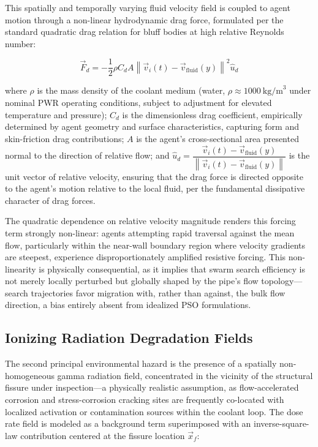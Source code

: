 \documentclass[journal]{IEEEtran}
\begin{document}
This spatially and temporally varying fluid velocity field is coupled to agent motion through a non-linear hydrodynamic drag force, formulated per the standard quadratic drag relation for bluff bodies at high relative Reynolds number:

\begin{equation}
\vec{F}_d = -\frac{1}{2}\rho C_d A \left\|\vec{v}_i(t) - \vec{v}_{\text{fluid}}(y)\right\|^2 \hat{u}_d
\end{equation}

where $\rho$ is the mass density of the coolant medium (water, $\rho \approx 1000\ \text{kg/m}^3$ under nominal PWR operating conditions, subject to adjustment for elevated temperature and pressure); $C_d$ is the dimensionless drag coefficient, empirically determined by agent geometry and surface characteristics, capturing form and skin-friction drag contributions; $A$ is the agent's cross-sectional area presented normal to the direction of relative flow; and $\hat{u}_d = \dfrac{\vec{v}_i(t) - \vec{v}_{\text{fluid}}(y)}{\left\|\vec{v}_i(t) - \vec{v}_{\text{fluid}}(y)\right\|}$ is the unit vector of relative velocity, ensuring that the drag force is directed opposite to the agent's motion relative to the local fluid, per the fundamental dissipative character of drag forces.

The quadratic dependence on relative velocity magnitude renders this forcing term strongly non-linear: agents attempting rapid traversal against the mean flow, particularly within the near-wall boundary region where velocity gradients are steepest, experience disproportionately amplified resistive forcing. This non-linearity is physically consequential, as it implies that swarm search efficiency is not merely locally perturbed but globally shaped by the pipe's flow topology---search trajectories favor migration with, rather than against, the bulk flow direction, a bias entirely absent from idealized PSO formulations.

\subsection{Ionizing Radiation Degradation Fields}
\label{sec:radiation}

The second principal environmental hazard is the presence of a spatially non-homogeneous gamma radiation field, concentrated in the vicinity of the structural fissure under inspection---a physically realistic assumption, as flow-accelerated corrosion and stress-corrosion cracking sites are frequently co-located with localized activation or contamination sources within the coolant loop. The dose rate field is modeled as a background term superimposed with an inverse-square-law contribution centered at the fissure location $\vec{x}_f$:
\end{document}
